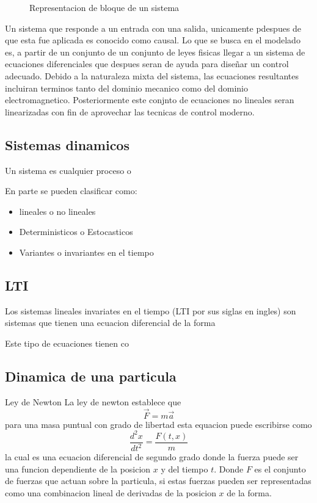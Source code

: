 \begin{figure}
\begin{center}
\centering
{}
\caption{Representacion de bloque de un sistema}
\end{center}
\end{figure}

Un sistema que responde a un entrada con una salida, unicamente pdespues de que esta fue aplicada es conocido como causal.
Lo que se busca en el modelado es, a partir de un conjunto de un 
conjunto de leyes fisicas llegar a un sistema de ecuaciones diferenciales que despues 
seran de ayuda para diseñar un control adecuado. Debido a la naturaleza mixta del 
sistema, las ecuaciones resultantes incluiran terminos tanto del dominio mecanico como 
del dominio electromagnetico. Posteriormente este conjnto de ecuaciones no lineales seran linearizadas con fin de aprovechar las tecnicas de control moderno.


\subsection{Sistemas dinamicos}
Un sistema es cualquier proceso o 

En parte se pueden clasificar como:
\begin{itemize}
\item lineales o no lineales
\item Deterministicos o Estocasticos
\item Variantes o invariantes en el tiempo
\end{itemize}

\subsection[1]{LTI}
Los sistemas lineales invariates en el tiempo (LTI por sus siglas en ingles) son sistemas que tienen una ecuacion diferencial de la forma


Este tipo de ecuaciones tienen co
\subsection{Dinamica de una particula}

Ley de Newton
La ley de newton establece que 
$$ \vec{F} = m\vec{a} $$
para una masa puntual con grado de libertad esta equacion puede
escribirse como
$$ \frac{d^2x}{dt^2}=\frac{F(t,x)}{m}$$
la cual es una ecuacion diferencial de segundo grado donde la fuerza puede ser una
funcion dependiente de la posicion $x$ y del tiempo $t$.
Donde $F$ es el conjunto de fuerzas que actuan sobre la particula, si estas fuerzas pueden ser representadas como una combinacion lineal de derivadas de la posicion $x$ de la forma.

